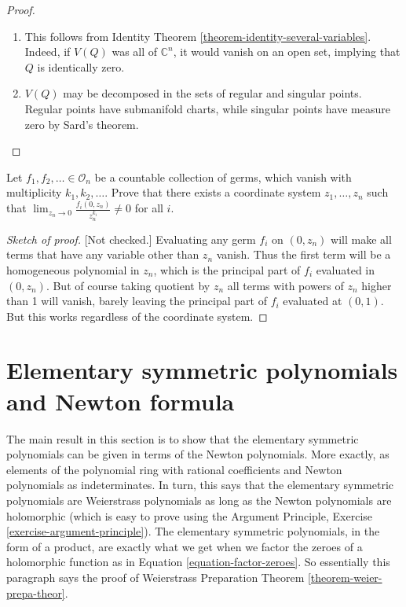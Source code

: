 \begin{proof}
\begin{enumerate}
\item This follows from Identity Theorem
\ref{theorem-identity-several-variables}.
Indeed, if $V(Q)$ was all of
$\mathbb{C}^{n}$, it would vanish on an open
set, implying that $Q$ is
identically zero.
\item $V(Q)$ may be decomposed in the sets of
regular and singular points.
Regular points have submanifold charts, while
singular points have measure zero
by Sard's theorem.
\end{enumerate}
\end{proof}

\begin{exercise}
\label{exercise-principal-parts}
Let $f_1,f_2,\ldots\in \mathcal{O}_n$ be a
countable collection of germs, which
vanish with multiplicity $k_1,k_2,\ldots$.
Prove that there exists a coordinate
system $z_1,\ldots,z_n$ such that
$\lim_{z_n\to 0}
\frac{f_i(0,z_n)}{z_n^{k_i}}\neq 0$ for all
$i$.
\end{exercise}

\begin{proof}[Sketch of proof]
[Not checked.] Evaluating
any germ $f_i$ on $(0,z_n)$ will
make all terms that have any variable other
than $z_n$ vanish. Thus the first
term will be a homogeneous polynomial in
$z_n$, which is the principal part of
$f_i$ evaluated in $(0,z_n)$. But of course
taking quotient by $z_n$ all terms
with powers of $z_n$ higher than 1 will
vanish, barely leaving the principal
part of $f_i$ evaluated at $(0,1)$. But this
works regardless of the coordinate
system.
\end{proof}

\section{Elementary symmetric polynomials and
Newton formula}
\label{section-eleme-symme-polyn-newto}

\noindent
The main result in this section
is to show that the elementary symmetric
polynomials
can be given in terms of the Newton
polynomials.
More exactly, as elements of the polynomial
ring with rational coefficients and Newton
polynomials
as indeterminates.
In turn, this says that the elementary
symmetric polynomials
are Weierstrass polynomials as long as the
Newton polynomials
are holomorphic (which is easy to prove using
the Argument Principle,
Exercise \ref{exercise-argument-principle}).
The elementary symmetric polynomials, in the
form of a product,
are exactly what we get when we factor the
zeroes
of a holomorphic function as in Equation
\ref{equation-factor-zeroes}.
So essentially this paragraph says the proof
of
Weierstrass Preparation Theorem
\ref{theorem-weier-prepa-theor}.

